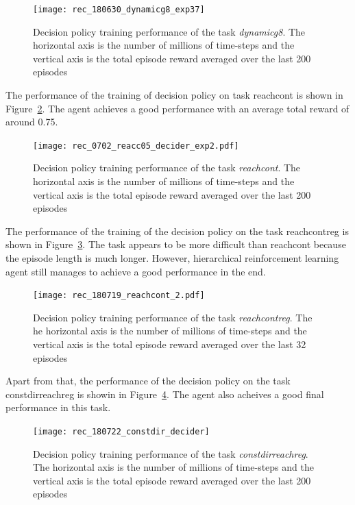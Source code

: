 \begin{figure}[!htbp]
\centering
\texttt{[image: rec\_180630\_dynamicg8\_exp37]}
\caption{Decision policy training performance of the task \textit{dynamicg8}. The horizontal axis is the number of millions of time-steps and the vertical axis is the total episode reward averaged over the last 200 episodes}
\label{fig:rec_dynamicg8_decider_subt10}
\end{figure}

The performance of the training of decision policy on task reachcont is shown in Figure~\ref{fig:rec_reachc05_decider_subt10}. The agent achieves a good performance with an average total reward of around 0.75.
\begin{figure}[!htbp]
\centering
\texttt{[image: rec\_0702\_reacc05\_decider\_exp2.pdf]}
\caption{Decision policy training performance of the task \textit{reachcont}. The horizontal axis is the number of millions of time-steps and the vertical axis is the total episode reward averaged over the last 200 episodes}
\label{fig:rec_reachc05_decider_subt10}
\end{figure}

The performance of the training of the decision policy on the task reachcontreg is shown in Figure~\ref{rec_reachcontreg}. The task appears to be more difficult than reachcont because the episode length is much longer. However, hierarchical reinforcement learning agent still manages to achieve a good performance in the end.
\begin{figure}[!htbp]
	\centering
	\texttt{[image: rec\_180719\_reachcont\_2.pdf]}
	\caption{Decision policy training performance of the task \textit{reachcontreg}. The he horizontal axis is the number of millions of time-steps and the vertical axis is the total episode reward averaged over the last 32 episodes}
	\label{rec_reachcontreg}
\end{figure}

Apart from that, the performance of the decision policy on the task constdirreachreg is showin in Figure~\ref{rec_constdirreachreg}. The agent also acheives a good final performance in this task.
\begin{figure}[!htbp]
	\centering
	\texttt{[image: rec\_180722\_constdir\_decider]}
	\caption{Decision policy training performance of the task \textit{constdirreachreg}. The horizontal axis is the number of millions of time-steps and the vertical axis is the total episode reward averaged over the last 200 episodes}
	\label{rec_constdirreachreg}
\end{figure}

